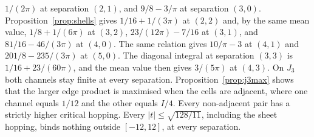 \(1/(2\pi)\) at separation \((2,1)\), and \(9/8-3/\pi\) at separation
\((3,0)\).
Proposition~\ref{prop:shells} gives \(1/16+1/(3\pi)\) at \((2,2)\) and, by the
same mean value, \(1/8+1/(6\pi)\) at \((3,2)\),
\(23/(12\pi)-7/16\) at \((3,1)\), and \(81/16-46/(3\pi)\) at \((4,0)\).
The same relation gives \(10/\pi-3\) at \((4,1)\) and
\(201/8-235/(3\pi)\) at \((5,0)\).
The diagonal integral at separation \((3,3)\) is \(1/16+23/(60\pi)\),
and the mean value then gives \(3/(5\pi)\) at \((4,3)\).
On \(J_3\) both channels stay finite at every separation.
Proposition~\ref{prop:j3max} shows that the larger edge product is
maximised when the cells are adjacent, where one channel equals \(1/12\)
and the other equals \(I/4\).
Every non-adjacent pair has a strictly higher critical hopping.
Every \(|t|\le\sqrt{128/11}\), including the sheet hopping, binds nothing
outside \([-12,12]\), at every separation.
